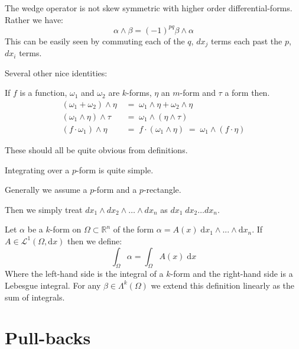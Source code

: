 The wedge operator is not skew symmetric with higher order differential-forms.
Rather we have:
\begin{equation}
	\alpha \wedge \beta = (-1)^{pq} \beta \wedge \alpha
\end{equation}
This can be easily seen by commuting each of the $q$, $dx_{j}$ terms each past the $p$, $dx_{i}$ terms.


Several other nice identities:

If $f$ is a function, $\omega_1$ and $\omega_2$ are $k$-forms, $\eta$ an $m$-form and $\tau$ a form then.
\begin{align}
	(\omega_1 + \omega_2) \wedge \eta  & \;=\; \omega_1 \wedge \eta + \omega_2 \wedge \eta \\
	(\omega_1 \wedge \eta) \wedge \tau & \;=\; \omega_1 \wedge ( \eta \wedge \tau ) \\
	(f \cdot \omega_1) \wedge \eta & \;=\;  f \cdot (\omega_1 \wedge \eta) \;=\; \omega_1 \wedge (f \cdot \eta)
\end{align}


These should all be quite obvious from definitions. 

Integrating over a $p$-form is quite simple.

Generally we assume a $p$-form and a $p$-rectangle.

Then we simply treat $dx_1 \wedge dx_2 \wedge \ldots \wedge dx_n$ as $dx_1 \;dx_2 \ldots dx_n$. 


\begin{definition}
Let $\alpha$ be a $k$-form on $\Omega \subset \mathbb{R}^n$ of the form $\alpha = A(x) \; \text{d}x_1 \wedge ... \wedge \text{d} x_n$.
If $A \in \mathcal{L}^1 (\Omega , \text{d}x)$ then we define:
\begin{equation}
\int_\Omega \alpha = \int_\Omega A(x) \; \text{d}x
\end{equation}
Where the left-hand side is the integral of a $k$-form and the right-hand side is a Lebesgue integral.
For any $\beta \in \Lambda^k (\Omega)$ we extend this definition linearly as the sum of integrals.
\end{definition}



%
%

\section{Pull-backs}

